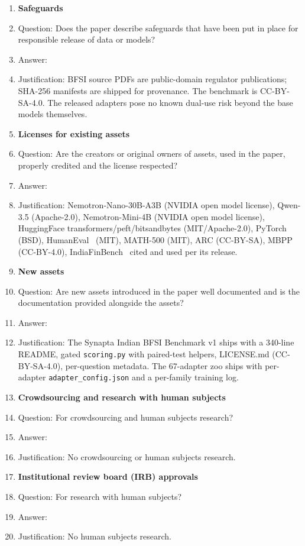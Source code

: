 \documentclass{article}
\begin{document}
\begin{enumerate}
\item {\bf Safeguards}
    \item[] Question: Does the paper describe safeguards that have been put in place for responsible release of data or models?
    \item[] Answer: \answerYes{}
    \item[] Justification: BFSI source PDFs are public-domain regulator publications; SHA-256 manifests are shipped for provenance. The benchmark is CC-BY-SA-4.0. The released adapters pose no known dual-use risk beyond the base models themselves.

\item {\bf Licenses for existing assets}
    \item[] Question: Are the creators or original owners of assets, used in the paper, properly credited and the license respected?
    \item[] Answer: \answerYes{}
    \item[] Justification: Nemotron-Nano-30B-A3B (NVIDIA open model license), Qwen-3.5 (Apache-2.0), Nemotron-Mini-4B (NVIDIA open model license), HuggingFace transformers/peft/bitsandbytes (MIT/Apache-2.0), PyTorch (BSD), HumanEval~\citep{chen2021humaneval} (MIT), MATH-500 (MIT), ARC (CC-BY-SA), MBPP (CC-BY-4.0), IndiaFinBench~\citep{pall2026indiafinbench} cited and used per its release.

\item {\bf New assets}
    \item[] Question: Are new assets introduced in the paper well documented and is the documentation provided alongside the assets?
    \item[] Answer: \answerYes{}
    \item[] Justification: The Synapta Indian BFSI Benchmark v1 ships with a 340-line README, gated \texttt{scoring.py} with paired-test helpers, LICENSE.md (CC-BY-SA-4.0), per-question metadata. The 67-adapter zoo ships with per-adapter \texttt{adapter\_config.json} and a per-family training log.

\item {\bf Crowdsourcing and research with human subjects}
    \item[] Question: For crowdsourcing and human subjects research?
    \item[] Answer: \answerNA{}
    \item[] Justification: No crowdsourcing or human subjects research.

\item {\bf Institutional review board (IRB) approvals}
    \item[] Question: For research with human subjects?
    \item[] Answer: \answerNA{}
    \item[] Justification: No human subjects research.


\end{enumerate}
\end{document}

